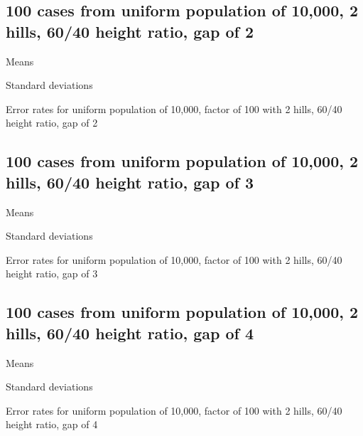 \subsection{100 cases from uniform population of 10,000, 2 hills, 60/40 height ratio, gap of 2}
\begin{table}[H]
\centering
\scriptsize

    \begin{subtable}{0.5\textwidth}
    
    \caption[]{Means} 
    \end{subtable}%
    \begin{subtable}{0.5\textwidth}
    
    \caption[]{Standard deviations} 
    \end{subtable}

\caption[]{Error rates for uniform population of 10,000, factor of 100 with 2 hills, 60/40 height ratio, gap of 2}
\label{tbl:mean_error_rates:unif_100_1_2h_2}
\end{table}

\subsection{100 cases from uniform population of 10,000, 2 hills, 60/40 height ratio, gap of 3}
\begin{table}[H]
\centering
\scriptsize

    \begin{subtable}{0.5\textwidth}
    
    \caption[]{Means} 
    \end{subtable}%
    \begin{subtable}{0.5\textwidth}
    
    \caption[]{Standard deviations} 
    \end{subtable}

\caption[]{Error rates for uniform population of 10,000, factor of 100 with 2 hills, 60/40 height ratio, gap of 3}
\label{tbl:mean_error_rates:unif_100_1_2h_3}
\end{table}
\subsection{100 cases from uniform population of 10,000, 2 hills, 60/40 height ratio, gap of 4}
\begin{table}[H]
\centering
\scriptsize

    \begin{subtable}{0.5\textwidth}
    
    \caption[]{Means} 
    \end{subtable}%
    \begin{subtable}{0.5\textwidth}
    
    \caption[]{Standard deviations} 
    \end{subtable}

\caption[]{Error rates for uniform population of 10,000, factor of 100 with 2 hills, 60/40 height ratio, gap of 4}
\label{tbl:mean_error_rates:unif_100_1_2h_4}
\end{table}

